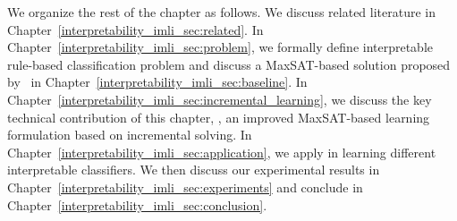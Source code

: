 We organize the rest of the chapter as follows. We discuss related literature in Chapter~\ref{interpretability_imli_sec:related}. In Chapter~\ref{interpretability_imli_sec:problem}, we formally define interpretable rule-based classification problem and discuss a MaxSAT-based solution proposed by~\cite{malioutov2018mlic} in Chapter~\ref{interpretability_imli_sec:baseline}. In Chapter~\ref{interpretability_imli_sec:incremental_learning}, we discuss the key technical contribution of this chapter, {\imli}, an improved MaxSAT-based learning formulation based on incremental solving. In Chapter~\ref{interpretability_imli_sec:application}, we apply {\imli} in learning different interpretable classifiers. We then discuss our experimental results in Chapter~\ref{interpretability_imli_sec:experiments} and conclude in Chapter~\ref{interpretability_imli_sec:conclusion}. 








